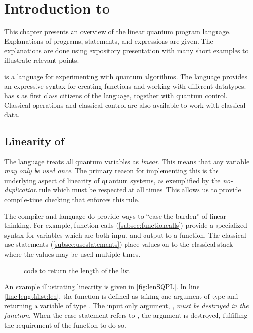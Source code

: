 \lstset{style=inlinqpl}
\section{Introduction to \lqpl}\label{sec:introlqpl}
This chapter  presents an overview of the linear quantum
program language. Explanations of \lqpl{} programs, statements, 
and expressions are given. The explanations are done
using expository presentation with  many short examples to
illustrate relevant points.


\lqpl{} is  a language for experimenting with  quantum
algorithms. The language provides an expressive syntax for creating functions 
and working with different datatypes. \lqpl{} has \qbit{}s as first class
citizens of the language, together with quantum control. 
Classical operations and classical control are also available to 
work with classical data.

\subsection{Linearity of \lqpl}\label{subsec:lqpllinearity}
The language \lqpl{} treats all quantum variables as \emph{linear}. This 
means that any variable \emph{may only be used once}. 
The primary reason for implementing this is the underlying aspect of 
linearity of quantum systems, as exemplified by 
 the \emph{no-duplication} rule which must be respected at all times. 
This allows us to provide
compile-time checking that enforces this rule.

The compiler and language do
 provide ways to ``ease the burden'' of linear thinking. 
For example, function calls (\vref{subsec:functioncalls}) 
provide a specialized syntax for variables
which are both input and output to a function. The classical 
use statements (\vref{subsec:usestatements}) place values on to the
classical stack where the values may be used multiple times.

\begin{figure}[htbp]

\caption{\lqpl{} code to return the length of the list}\label{fig:lenSQPL}
\end{figure}

An example illustrating linearity is given in \vref{fig:lenSQPL}. In
line \ref{line:lengthlist:len}, the function  is defined
as taking one argument of type  and returning
a variable of type . The input only argument, ,
\emph{must be destroyed in the function}. When the
case statement refers to , the argument is 
destroyed, fulfilling the requirement of the function to do so.



